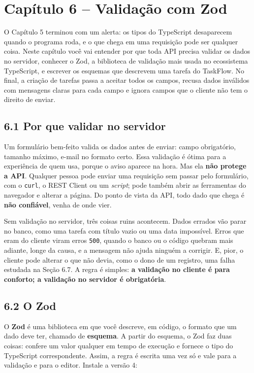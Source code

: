 \section{Capítulo 6 -- Validação com Zod}

O Capítulo 5 terminou com um alerta: os tipos do TypeScript desaparecem quando o programa roda, e o que chega em uma requisição pode ser qualquer coisa. Neste capítulo você vai entender por que toda API precisa validar os dados no servidor, conhecer o Zod, a biblioteca de validação mais usada no ecossistema TypeScript, e escrever os esquemas que descrevem uma tarefa do TaskFlow. No final, a criação de tarefas passa a aceitar todos os campos, recusa dados inválidos com mensagens claras para cada campo e ignora campos que o cliente não tem o direito de enviar.

\subsection{6.1 Por que validar no servidor}

Um formulário bem-feito valida os dados antes de enviar: campo obrigatório, tamanho máximo, e-mail no formato certo. Essa validação é ótima para a experiência de quem usa, porque o aviso aparece na hora. Mas ela \textbf{não protege a API}. Qualquer pessoa pode enviar uma requisição sem passar pelo formulário, com o \texttt{curl}, o REST Client ou um \textit{script}; pode também abrir as ferramentas do navegador e alterar a página. Do ponto de vista da API, todo dado que chega é \textbf{não confiável}, venha de onde vier.

Sem validação no servidor, três coisas ruins acontecem. Dados errados vão parar no banco, como uma tarefa com título vazio ou uma data impossível. Erros que eram do cliente viram erros \texttt{500}, quando o banco ou o código quebram mais adiante, longe da causa, e a mensagem não ajuda ninguém a corrigir. E, pior, o cliente pode alterar o que não devia, como o dono de um registro, uma falha estudada na Seção 6.7. A regra é simples: \textbf{a validação no cliente é para conforto; a validação no servidor é obrigatória}.

\subsection{6.2 O Zod}

O \textbf{Zod} é uma biblioteca em que você descreve, em código, o formato que um dado deve ter, chamado de \textbf{esquema}. A partir do esquema, o Zod faz duas coisas: confere um valor qualquer em tempo de execução e fornece o tipo do TypeScript correspondente. Assim, a regra é escrita uma vez só e vale para a validação e para o editor. Instale a versão 4:

